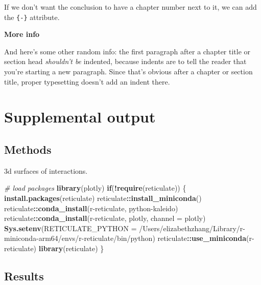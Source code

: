 \documentclass[12pt, twoside]{amherstthesis}
\newenvironment{Shaded}{\begin{snugshade}}{\end{snugshade}}
\newcommand{\AttributeTok}[1]{\textcolor[rgb]{0.13,0.29,0.53}{#1}}
\newcommand{\CommentTok}[1]{\textcolor[rgb]{0.56,0.35,0.01}{\textit{#1}}}
\newcommand{\ControlFlowTok}[1]{\textcolor[rgb]{0.13,0.29,0.53}{\textbf{#1}}}
\newcommand{\FunctionTok}[1]{\textcolor[rgb]{0.13,0.29,0.53}{\textbf{#1}}}
\newcommand{\NormalTok}[1]{#1}
\newcommand{\SpecialCharTok}[1]{\textcolor[rgb]{0.81,0.36,0.00}{\textbf{#1}}}
\newcommand{\StringTok}[1]{\textcolor[rgb]{0.31,0.60,0.02}{#1}}
\begin{document}
If we don't want the conclusion to have a chapter number next to it, we can add the \texttt{\{-\}} attribute.

\textbf{More info}

And here's some other random info: the first paragraph after a chapter title or section head \emph{shouldn't be} indented, because indents are to tell the reader that you're starting a new paragraph. Since that's obvious after a chapter or section title, proper typesetting doesn't add an indent there.

\appendix

\hypertarget{supplemental-output}{%
\chapter{Supplemental output}\label{supplemental-output}}

\hypertarget{methods-1}{%
\section{Methods}\label{methods-1}}

3d surfaces of interactions.
\begin{Shaded}
\begin{Highlighting}[]
\CommentTok{\# load packages}
\FunctionTok{library}\NormalTok{(plotly)}
\ControlFlowTok{if}\NormalTok{(}\SpecialCharTok{!}\FunctionTok{require}\NormalTok{(reticulate)) \{}
  \FunctionTok{install.packages}\NormalTok{(}\StringTok{\textquotesingle{}reticulate\textquotesingle{}}\NormalTok{)}
\NormalTok{  reticulate}\SpecialCharTok{::}\FunctionTok{install\_miniconda}\NormalTok{()}
\NormalTok{  reticulate}\SpecialCharTok{::}\FunctionTok{conda\_install}\NormalTok{(}\StringTok{\textquotesingle{}r{-}reticulate\textquotesingle{}}\NormalTok{, }\StringTok{\textquotesingle{}python{-}kaleido\textquotesingle{}}\NormalTok{)}
\NormalTok{  reticulate}\SpecialCharTok{::}\FunctionTok{conda\_install}\NormalTok{(}\StringTok{\textquotesingle{}r{-}reticulate\textquotesingle{}}\NormalTok{, }\StringTok{\textquotesingle{}plotly\textquotesingle{}}\NormalTok{, }\AttributeTok{channel =} \StringTok{\textquotesingle{}plotly\textquotesingle{}}\NormalTok{)}
  \FunctionTok{Sys.setenv}\NormalTok{(}\AttributeTok{RETICULATE\_PYTHON =} 
               \StringTok{\textquotesingle{}/Users/elizabethzhang/Library/r{-}miniconda{-}arm64/envs/r{-}reticulate/bin/python\textquotesingle{}}\NormalTok{)}
\NormalTok{  reticulate}\SpecialCharTok{::}\FunctionTok{use\_miniconda}\NormalTok{(}\StringTok{\textquotesingle{}r{-}reticulate\textquotesingle{}}\NormalTok{)}
  \FunctionTok{library}\NormalTok{(reticulate)}
\NormalTok{\}}
\end{Highlighting}
\end{Shaded}
\hypertarget{results-1}{%
\section{Results}\label{results-1}}
\end{document}
